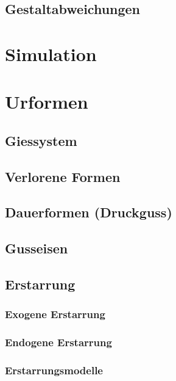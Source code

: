 \documentclass[12pt]{cheatsheet}
\begin{document}
    \subsection*{Gestaltabweichungen}
    

\section*{Simulation}
    

\section*{Urformen}
    \subsection*{Giessystem}
        
    \subsection*{Verlorene Formen}
    
    \subsection*{Dauerformen (Druckguss)}
    
    \subsection*{Gusseisen}
    
    \subsection*{Erstarrung}
    
    \subsubsection*{Exogene Erstarrung}
    
    \subsubsection*{Endogene Erstarrung}
    
    \subsubsection*{Erstarrungsmodelle}
    
\end{document}
